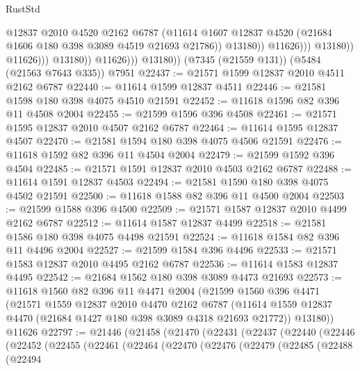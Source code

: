 \begin{lexlean}{RustStd}
\begin{coremodule}
{\begin{coremodule}
{{{{{{{{{{{{{{{{{{{{{{{{{{{{{{{                                      @12837
                                      @2010
                                      @4520
                                      @2162
                                      @6787
                                      (@11614
                                        @1607
                                        @12837
                                        @4520
                                        (@21684 @1606 @180 @398 @3089 @4519 @21693 @21786))
                                      @13180))
                                  @11626)))
                            @13180))
                        @11626)))
                  @13180))
              @11626)))
        @13180))
    (@7345 (@21559 @131))
    (@5484 (@21563 @7643 @335))
    @7951
@22437 := @21571 @1599 @12837 @2010 @4511 @2162 @6787
@22440 := @11614 @1599 @12837 @4511
@22446 := @21581 @1598 @180 @398 @4075 @4510 @21591
@22452 := @11618 @1596 @82 @396 @11 @4508 @2004
@22455 := @21599 @1596 @396 @4508
@22461 := @21571 @1595 @12837 @2010 @4507 @2162 @6787
@22464 := @11614 @1595 @12837 @4507
@22470 := @21581 @1594 @180 @398 @4075 @4506 @21591
@22476 := @11618 @1592 @82 @396 @11 @4504 @2004
@22479 := @21599 @1592 @396 @4504
@22485 := @21571 @1591 @12837 @2010 @4503 @2162 @6787
@22488 := @11614 @1591 @12837 @4503
@22494 := @21581 @1590 @180 @398 @4075 @4502 @21591
@22500 := @11618 @1588 @82 @396 @11 @4500 @2004
@22503 := @21599 @1588 @396 @4500
@22509 := @21571 @1587 @12837 @2010 @4499 @2162 @6787
@22512 := @11614 @1587 @12837 @4499
@22518 := @21581 @1586 @180 @398 @4075 @4498 @21591
@22524 := @11618 @1584 @82 @396 @11 @4496 @2004
@22527 := @21599 @1584 @396 @4496
@22533 := @21571 @1583 @12837 @2010 @4495 @2162 @6787
@22536 := @11614 @1583 @12837 @4495
@22542 := @21684 @1562 @180 @398 @3089 @4473 @21693
@22573 := @11618
    @1560
    @82
    @396
    @11
    @4471
    @2004
    (@21599
      @1560
      @396
      @4471
      (@21571
        @1559
        @12837
        @2010
        @4470
        @2162
        @6787
        (@11614 @1559 @12837 @4470 (@21684 @1427 @180 @398 @3089 @4318 @21693 @21772))
        @13180))
    @11626
@22797 := @21446
    (@21458
      (@21470
        (@22431
          (@22437
            (@22440
              (@22446
                (@22452
                  (@22455
                    (@22461
                      (@22464
                        (@22470
                          (@22476
                            (@22479
                              (@22485
                                (@22488
                                  (@22494
}}}}}}}}}}}}}}}}}}}}}}}}}}}}}}}
\end{coremodule}}
\end{coremodule}
\end{lexlean}
